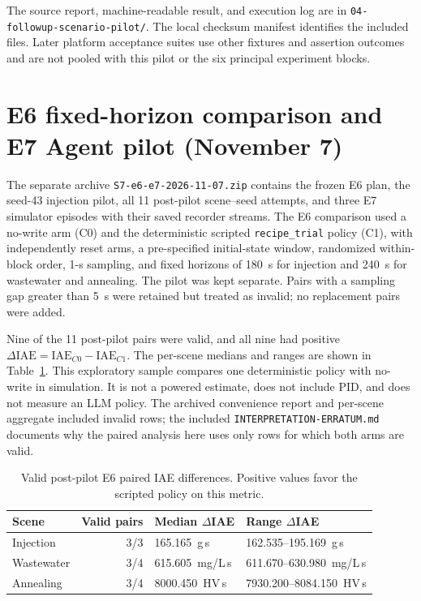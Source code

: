 \documentclass[10pt]{article}
\begin{document}
The source report, machine-readable result, and execution log are in
\texttt{04-followup-scenario-pilot/}. The local checksum manifest identifies
the included files. Later platform acceptance suites use other fixtures and
assertion outcomes and are not pooled with this pilot or the six principal
experiment blocks.

\section*{E6 fixed-horizon comparison and E7 Agent pilot (November 7)}
The separate archive \texttt{S7-e6-e7-2026-11-07.zip} contains the frozen E6 plan, the seed-43 injection pilot, all 11 post-pilot scene--seed attempts, and three E7 simulator episodes with their saved recorder streams. The E6 comparison used a no-write arm (C0) and the deterministic scripted \texttt{recipe\_trial} policy (C1), with independently reset arms, a pre-specified initial-state window, randomized within-block order, 1-s sampling, and fixed horizons of 180~s for injection and 240~s for wastewater and annealing. The pilot was kept separate. Pairs with a sampling gap greater than 5~s were retained but treated as invalid; no replacement pairs were added.

Nine of the 11 post-pilot pairs were valid, and all nine had positive $\Delta\mathrm{IAE}=\mathrm{IAE}_{C0}-\mathrm{IAE}_{C1}$. The per-scene medians and ranges are shown in Table~\ref{tab:s7-e6}. This exploratory sample compares one deterministic policy with no-write in simulation. It is not a powered estimate, does not include PID, and does not measure an LLM policy. The archived convenience report and per-scene aggregate included invalid rows; the included \texttt{INTERPRETATION-ERRATUM.md} documents why the paired analysis here uses only rows for which both arms are valid.

\begin{table}[h]
\centering
\caption{Valid post-pilot E6 paired IAE differences. Positive values favor the scripted policy on this metric.}
\label{tab:s7-e6}
\footnotesize
\begin{tabularx}{\textwidth}{@{}l r X X@{}}
\toprule
Scene & Valid pairs & Median $\Delta$IAE & Range $\Delta$IAE \\
\midrule
Injection & 3/3 & 165.165~g\,s & 162.535--195.169~g\,s \\
Wastewater & 3/4 & 615.605~mg/L\,s & 611.670--630.980~mg/L\,s \\
Annealing & 3/4 & 8000.450~HV\,s & 7930.200--8084.150~HV\,s \\
\bottomrule
\end{tabularx}
\end{table}
\end{document}
